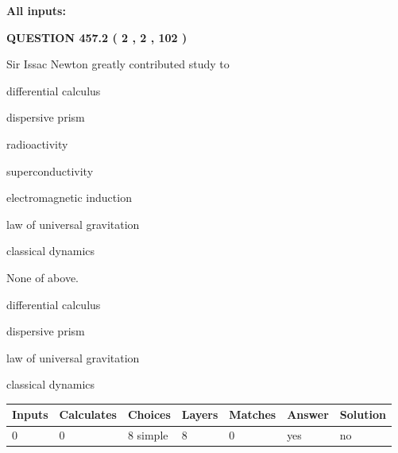 \documentclass[12pt]{article}
\begin{document}
   
\noindent\vspace{0.1in}\hspace{-0.08in} {\textbf{\Large{All inputs: }}}
   
   
  
\vspace{0.2in}
  
{\textbf{\Large{QUESTION
457.2 
 ( 2 , 2 , 102 )
}}}
  
  
Sir Issac Newton greatly contributed study to
 
 
differential calculus
 
 
dispersive prism
 
 
radioactivity
 
 
superconductivity
 
 
electromagnetic induction
 
 
law of universal gravitation
 
 
classical dynamics
 
 
 None of above.
 
 
\noindent{}
 
 
differential calculus
 
 
dispersive prism
 
 
law of universal gravitation
 
 
classical dynamics
 
 
\noindent{}
 
 
   
   
   
   
\noindent\begin{tabular}{|l|l|l|l|l|l|l|}
 \hline
Inputs & Calculates & Choices & Layers & Matches & Answer & Solution \\ \hline
 0  & 
 0  & 
 8
  simple  
  & 
 8  & 
 0  & 
  yes & 
  no 
  \\ \hline
 \end{tabular}
   
   
   
   
\noindent{}
   
\end{document}
